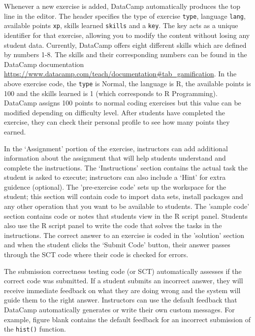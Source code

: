 \documentclass[12pt]{article}
\begin{document}
Whenever a new exercise is added, DataCamp automatically produces the top line in the editor. The header specifies the type
of exercise \texttt{type}, language \texttt{lang}, available points \texttt{xp}, skills learned \texttt{skills} and a \texttt{key}. The key acts as a unique
identifier for that exercise, allowing you to modify the content without losing any student data. Currently, DataCamp offers
eight different skills which are defined by numbers 1-8. The skills and their corresponding numbers can be found in the DataCamp
documentation \url{https://www.datacamp.com/teach/documentation#tab_gamification}. 
In the above exercise code, the \texttt{type} is Normal, the language is R, the available points is 100 and the skills learned is 1 (which 
corresponds to R Programming). DataCamp assigns 100 points to normal coding exercises but this value can be modified depending on
difficulty level. After students have completed the exercise, they can check their personal profile to see how many points they earned.

In the `Assignment' portion of the exercise, instructors can add additional information about the assignment that will help
students understand and complete the instructions. The `Instructions' section contains the actual task the student is
asked to execute; instructors can also include a `Hint' for extra guidence (optional). The 'pre-exercise code' sets up the workspace for 
the student; this section will contain code to import data sets, install packages and any other operation that you want to be available to
students. The 'sample code' section contains code or notes that students view in the R script panel. Students also use the R script panel to write
the code that solves the tasks in the instructions. The correct answer to an exercise is coded in the 'solution' section
and when the student clicks the `Submit Code' button, their answer passes through the SCT code where their code is checked for errors.


The submission correctness testing code (or SCT) automatically assesses if the correct code was submitted. If a student submits an 
incorrect answer, they will receive immediate feedback on what they are doing wrong and the system will guide them to the right answer.
Instructors can use the default feedback that DataCamp automatically generates or write their own custom messages. For example, figure blank
contains the default feedback for an incorrect submission of the \texttt{hist()} function.
\end{document}
